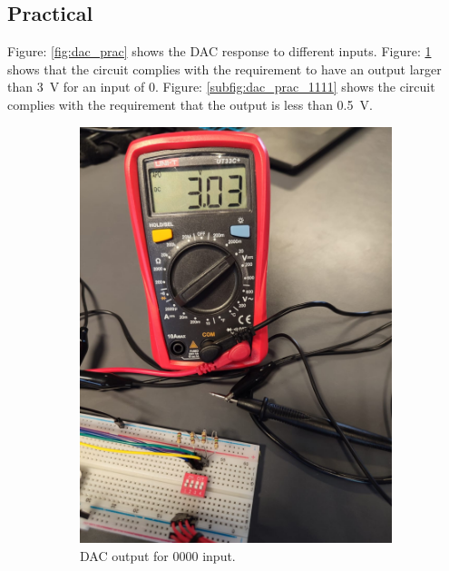 \subsection{Practical}
Figure: \ref{fig:dac_prac} shows the DAC response to different inputs. Figure: \ref{subfig:dac_prac_0000} shows that the circuit complies with the requirement to have an output larger than \SI{3}{\volt} for an input of 0. Figure: \ref{subfig:dac_prac_1111} shows the circuit complies with the requirement that the output is less than \SI{0.5}{\volt}.
\begin{figure}[H]
\centering
\begin{subfigure}[]{0.3\textwidth}
\includegraphics[width=\linewidth]{./Figures/DAC_Prac_0000.jpeg}
\caption{DAC output for 0000 input.}
\label{subfig:dac_prac_0000}	
\end{subfigure}
\hfill
\begin{subfigure}[]{0.3\textwidth}

\end{subfigure}
\end{figure}
